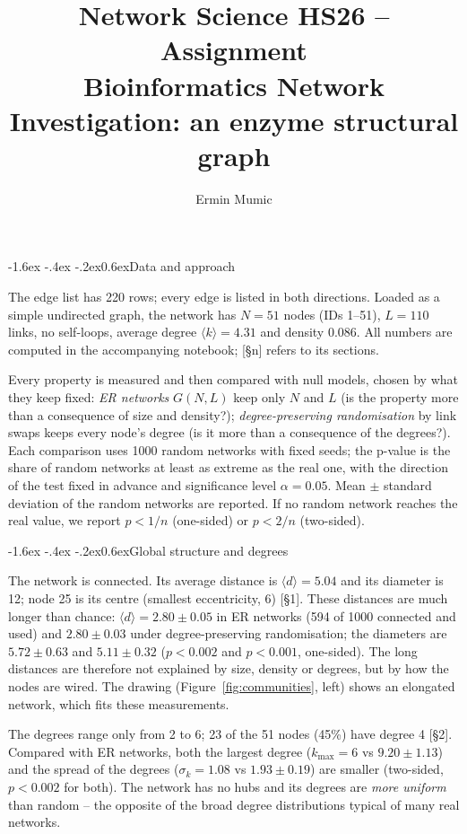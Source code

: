 \documentclass[10pt,a4paper]{article}
\title{Network Science HS26 -- Assignment\\[2pt]
\large Bioinformatics Network Investigation: an enzyme structural graph}
\author{Ermin Mumic}
\date{}
\makeatletter
\renewcommand\section{\@startsection{section}{1}{\z@}%
  {-1.6ex \@plus -.4ex \@minus -.2ex}{0.6ex}{\normalfont\large\bfseries}}
\makeatother
\begin{document}
\maketitle
\vspace{-1.5em}

\section{Data and approach}

The edge list has 220 rows; every edge is listed in both directions. Loaded as a simple
undirected graph, the network has $N = 51$ nodes (IDs 1--51), $L = 110$ links, no self-loops,
average degree $\langle k\rangle = 4.31$ and density $0.086$. All numbers are computed in the
accompanying notebook; [\S n] refers to its sections.

Every property is measured and then compared with null models, chosen by what they keep fixed:
\emph{ER networks} $G(N,L)$ keep only $N$ and $L$ (is the property more than a consequence of size
and density?); \emph{degree-preserving randomisation} by link swaps keeps every node's degree (is it
more than a consequence of the degrees?). Each comparison uses 1000 random networks with fixed seeds;
the p-value is the share of random networks at least as extreme as the real one, with the direction
of the test fixed in advance and significance level $\alpha = 0.05$. Mean $\pm$ standard deviation
of the random networks are reported. If no random network reaches the real value, we report
$p < 1/n$ (one-sided) or $p < 2/n$ (two-sided).

\section{Global structure and degrees}

The network is connected. Its average distance is $\langle d\rangle = 5.04$ and its diameter is 12;
node 25 is its centre (smallest eccentricity, 6) [\S1]. These distances are much longer than chance:
$\langle d\rangle = 2.80 \pm 0.05$ in ER networks (594 of 1000 connected and used) and
$2.80 \pm 0.03$ under degree-preserving randomisation; the diameters are $5.72 \pm 0.63$ and
$5.11 \pm 0.32$ ($p < 0.002$ and $p < 0.001$, one-sided). The long distances are therefore not
explained by size, density or degrees, but by how the nodes are wired. The drawing
(Figure~\ref{fig:communities}, left) shows an elongated network, which fits these measurements.

The degrees range only from 2 to 6; 23 of the 51 nodes (45\%) have degree 4 [\S2]. Compared with ER
networks, both the largest degree ($k_{\max} = 6$ vs $9.20 \pm 1.13$) and the spread of the degrees
($\sigma_k = 1.08$ vs $1.93 \pm 0.19$) are smaller (two-sided, $p < 0.002$ for both). The network has
no hubs and its degrees are \emph{more uniform} than random -- the opposite of the broad degree
distributions typical of many real networks.
\end{document}
